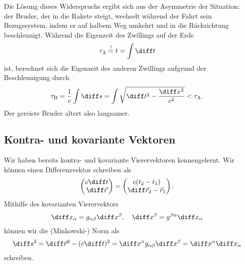 Die Lösung dieses Widerspruchs ergibt sich aus der Asymmetrie der Situation: der Bruder, der in die Rakete steigt, wechselt während der Fahrt sein Bezugssystem, indem er auf halbem Weg umkehrt und in die Rückrichtung beschleunigt.
Während die Eigenzeit des Zwillings auf der Erde
\begin{align*}
    \tau_\text{A}\overset!= t=\int\diff t
\end{align*}
ist, berechnet sich die Eigenzeit des anderen Zwillings aufgrund der Beschleunigung durch
\begin{align*}
    \tau_\mathrm{B} =\frac{1}{c}\int\diff s=\int \sqrt{\diff t^2-\frac{\diff x^2}{c^2}} < \tau_\mathrm{A}.
\end{align*}
Der gereiste Bruder altert also langsamer.



\subsection{Kontra- und kovariante Vektoren}

Wir haben bereits kontra- und kovariante Vierervektoren kennengelernt. Wir können einen Differenzvektor schreiben als
\begin{align*}
    \begin{pmatrix}c\diff t \\ \diff \vec r\end{pmatrix} = \begin{pmatrix}c(t_2-t_1) \\ \diff \vec r_2-\vec r_1\end{pmatrix}.
\end{align*}
Mithilfe des kovarianten Vierervektors
\begin{align*}
    \diff x_\alpha = g_{\alpha\beta}\diff x^\beta, \quad \diff x^\beta =g^{\beta\alpha}\diff x_\alpha
\end{align*}
können wir die (Minkowski-) Norm als
\begin{align*}
    \diff s^2=\diff\vec r^2-(c\diff t)^2=\diff x^\alpha g_{\alpha\beta}\diff x^\beta=\diff x^\alpha\diff x_\alpha
\end{align*}
schreiben.

